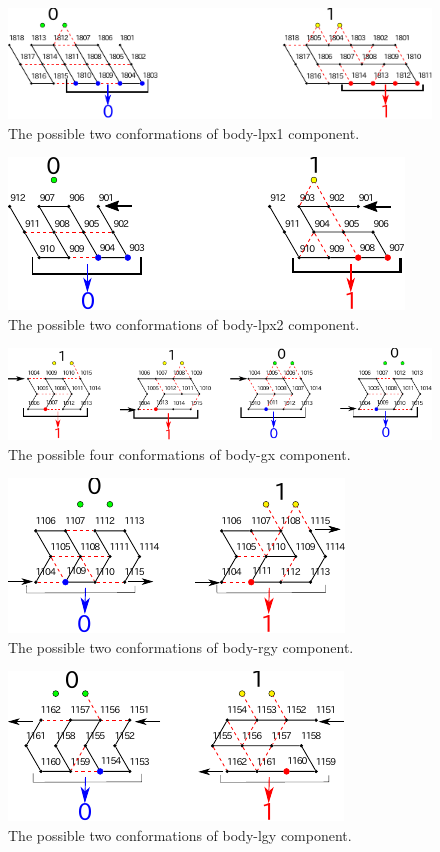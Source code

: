 \begin{figure}[h]
\centering
\includegraphics[width=0.8\linewidth]{pic/body-lpx1.pdf}
\caption{The possible two conformations of body-lpx1 component.}
\label{fig:body-lpx1}
\end{figure}

\begin{figure}[h]
\centering
\includegraphics[width=0.55\linewidth]{pic/body-lpx2.pdf}
\caption{The possible two conformations of body-lpx2 component.}
\label{fig:body-lpx2}
\end{figure}

\begin{figure}[h]
\centering
\includegraphics[width=\linewidth]{pic/body-gx.pdf}
\caption{The possible four conformations of body-gx component.}
\label{fig:body-gx}
\end{figure}

\begin{figure}[h]
\centering
\includegraphics[width=0.5\linewidth]{pic/body-rgy.pdf}
\caption{The possible two conformations of body-rgy component.}
\label{fig:body-rgy}
\end{figure}

\begin{figure}[h]
\centering
\includegraphics[width=0.5\linewidth]{pic/body-lgy.pdf}
\caption{The possible two conformations of body-lgy component.}
\label{fig:body-lgy}
\end{figure}


